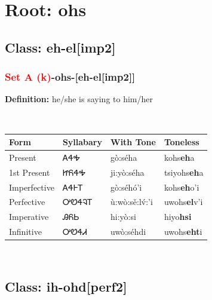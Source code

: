 \needspace{4in}
\section*{Root: ohs}
\nopagebreak
{}
\needspace{3in}
\subsection*{Class: eh-el[imp2]}
\nopagebreak
\needspace{2in}
\subsubsection*{\textcolor{Red}{Set A (k)}{-}\textbf{ohs}{-}[eh-el[imp2]]}
\nopagebreak
\textbf{Definition: } he/she is saying to him/her
\\[0.5em]
\begin{tabularx}{\textwidth}{l X X X}%
\toprule%
\textbf{Form}&\textbf{Syllabary}&\textbf{With Tone}&\textbf{Toneless}\\%
\midrule%
Present&ᎪᏎᎭ&gò:séha&kohs\textbf{eh}a\\%
1st Present&ᏥᏲᏎᎭ&ji:yò:séha&tsiyohs\textbf{eh}a\\%
Imperfective&ᎪᏎᎰᎢ&gò:séhó’i&kohs\textbf{eh}o'i\\%
Perfective&ᎤᏬᏎᎸᎢ&ù:wò:sě:lv́:’i&uwohs\textbf{el}v'i\\%
Imperative&ᎯᏲᏏ&hi:yò:si&hiyo\textbf{hsi}\\%
Infinitive&ᎤᏬᏎᏗ&uwò:séhdi&uwohs\textbf{eht}i\\%
\bottomrule%
\end{tabularx}
\\[1em]
\needspace{3in}
\subsection*{Class: ih-ohd[perf2]}
\nopagebreak
\needspace{2in}
